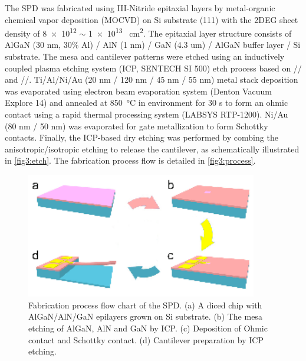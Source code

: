 The SPD  was fabricated using III-Nitride  epitaxial layers  by metal-organic chemical vapor deposition (MOCVD)  on Si substrate  (111) with the 2DEG  sheet density of \num{8e12} $\sim$ \num{1e13} \unit{\per\square\cm}. The epitaxial layer structure consists of AlGaN (30 \unit{nm}, 30$\%$ Al) / AlN (1 \unit{nm}) / GaN (4.3 \unit{um}) / AlGaN buffer layer / Si substrate. The mesa and cantilever  patterns were etched using an inductively coupled plasma etching system (ICP, SENTECH SI 500)  etch process based on // and //. Ti/Al/Ni/Au (20 \unit{nm} / 120 \unit{nm} / 45 \unit{nm} / 55 \unit{nm}) metal stack deposition was evaporated using electron beam evaporation  system (Denton Vacuum Explore 14) and annealed at \SI{850}{\degreeCelsius} in  environment for 30 \unit{\s} to form an ohmic contact  using a rapid thermal processing  system (LABSYS RTP-1200). Ni/Au (80 \unit{nm} / 50 \unit{nm}) was evaporated for gate metallization to form Schottky  contacts. Finally, the ICP-based dry etching was performed by combing the anisotropic/isotropic etching to release the  cantilever, as schematically illustrated in \autoref{fig3:etch}.  The fabrication process  flow is detailed in \autoref{fig3:process}.

\begin{figure}[H] 
\centering    
\includegraphics[width=0.9\textwidth]{ch3_process}
\caption[Fabrication process flow chart of the SPD]{Fabrication process flow chart of the SPD. (a) A diced chip with AlGaN/AlN/GaN epilayers grown on Si substrate. (b) The mesa etching of AlGaN, AlN and GaN by ICP. (c) Deposition of Ohmic contact and Schottky contact. (d) Cantilever preparation by ICP etching.}
\label{fig3:process}
\end{figure}


